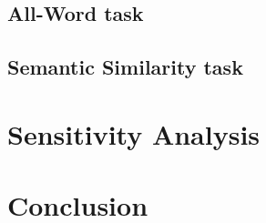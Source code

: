 \documentclass[a4paper, 12pt]{book}
\begin{document}
\section{All-Word task}\label{section:all-word-task}


\section{Semantic Similarity task}\label{section:sem-sim-task}

\chapter{Sensitivity Analysis}\label{chapter:sensitivity}

\chapter{Conclusion}


% 

% 
% 


%

\end{document}
